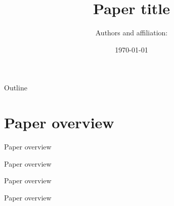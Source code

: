 \documentclass[aspectratio=169,xcolor=dvipsnames]{beamer}
\title[short title]{Paper title}
\author[Saeed Shurrab] {Authors and affiliation:}
\institute[NTU] %
{
    \begin{columns}[t] %

        \column{.5\textwidth} %
        \begin{enumerate}
            \item Author $x$  \ \ \ \ \ \ \ \ \ \ \ \ \ \ \ \ \ Institute $f(x)$
            \item Author $y$  \ \ \ \ \ \ \ \ \ \ \ \ \ \ \ \ \ Institute $f(x)$
            \item Author $z$  \ \ \ \ \ \ \ \ \ \ \ \ \ \ \ \ \ Institute $f(x)$
        \end{enumerate}



    \end{columns}
    \vskip 3pt
}
\date{\today} %
\begin{document}
\begin{frame}
    \titlepage
\end{frame}

\begin{frame}{Outline}
    \tableofcontents
\end{frame}

 \section{Paper overview}

\begin{frame}{Paper overview}


\end{frame}


\begin{frame}{Paper overview}


\end{frame}


\begin{frame}{Paper overview}


\end{frame}


\begin{frame}{Paper overview}


\end{frame}

\end{document}
